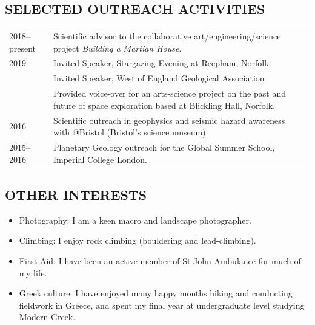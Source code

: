 \documentclass[11pt,twoside,a4paper]{article}
\begin{document}
\clearpage
\subsection*{SELECTED OUTREACH ACTIVITIES}

\vspace{-0.5em}
\begin{table}[!h]
\centering
\begin{tabular}{L{2cm} L{13cm} L{2cm}}
  2018--present \vfill & Scientific advisor to the collaborative art/engineering/science project \emph{Building a Martian House}. & \\
  2019  & Invited Speaker, Stargazing Evening at Reepham, Norfolk \\
  & Invited Speaker, West of England Geological Association \\
   \vfill & Provided voice-over for an arts-science project on the past and future of space exploration based at Blickling Hall, Norfolk. & \\
  2016 \vfill & Scientific outreach in geophysics and seismic hazard awareness with @Bristol (Bristol's science museum). & \\
  2015--2016 \vfill & Planetary Geology outreach for the Global Summer School, Imperial College London. &
\end{tabular}
\end{table}
\vspace{-1.5em}

\subsection*{OTHER INTERESTS}
\begin{itemize}
\item Photography: I am a keen macro and landscape photographer.
\item Climbing: I enjoy rock climbing (bouldering and lead-climbing).
\item First Aid: I have been an active member of St John Ambulance for much of my life.
\item Greek culture: I have enjoyed many happy months hiking and conducting fieldwork in Greece, and spent my final year at undergraduate level studying Modern Greek.
\end{itemize}
\end{document}

